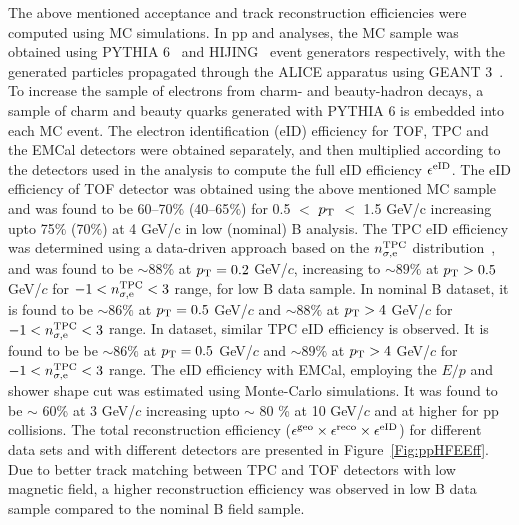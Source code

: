 The above mentioned acceptance and track reconstruction efficiencies were computed using MC simulations. In pp and \pPb analyses, the MC sample was obtained using PYTHIA 6~\cite{Sjostrand:2006za} and HIJING~\cite{Wang:1991hta} event generators respectively, with the generated particles propagated through the ALICE apparatus using GEANT 3~\cite{Brun:1073159}.  To increase the sample of electrons from charm- and beauty-hadron decays, a sample of charm and beauty quarks generated with PYTHIA 6 is embedded into each MC event. The electron identification (eID) efficiency for TOF, TPC and the EMCal detectors were obtained separately, and then multiplied according to the detectors used in the analysis to compute the full eID efficiency $\epsilon^{\rm eID}$. The eID efficiency of TOF detector was obtained using the above mentioned MC sample and was found to be 60--70$\%$ (40--65$\%$) for  0.5 $<$ $p_{\rm T}$ $<$ 1.5 GeV/c increasing upto 75$\%$ (70$\%$) at 4 GeV/c in low (nominal) B analysis. The TPC eID efficiency was determined using a data-driven approach based on the $n^{\rm{TPC}}_{\sigma,\rm{e}}$ distribution~\cite{Abelev:2012xe}, and was found to be $\sim 88\%$ at $p_{\rm T}= 0.2$ GeV/$c$, increasing to $\sim 89\%$ at $p_{\rm T} > 0.5$ GeV/$c$ for $-1 < n^{\rm{TPC}}_{\sigma,\rm{e}}< 3$ range, for low B data sample. In nominal B dataset, it is found to be $\sim 86\%$ at $p_{\rm T}= 0.5$ GeV/$c$ and $\sim 88\%$ at $p_{\rm T} > 4$ GeV/$c$ for $-1 < n^{\rm{TPC}}_{\sigma,\rm{e}}< 3$ range. In \pPb dataset, similar TPC eID efficiency is observed. It is found to be be $\sim 86\%$ at $p_{\rm T}= 0.5$ GeV/$c$ and $\sim 89\%$ at $p_{\rm T} > 4$ GeV/$c$ for $-1 < n^{\rm{TPC}}_{\sigma,\rm{e}}< 3$ range.  The eID efficiency with EMCal, employing the $E/p$  and shower shape cut was estimated using Monte-Carlo simulations. It was found to be $\sim$ 60\% at 3 GeV/$c$ increasing upto $\sim$ 80 \% at 10 GeV/$c$ and at higher \pt for pp collisions. 
The total reconstruction efficiency ($\epsilon^{\rm{geo}} \times \epsilon^{\rm reco} \times  \epsilon^{\rm {eID}}$) for different data sets and with different detectors are presented in Figure~\ref{Fig:ppHFEEff}. Due to better track matching between TPC and TOF detectors with low magnetic field, a higher reconstruction efficiency was observed in low B data sample compared to the nominal B field sample.

